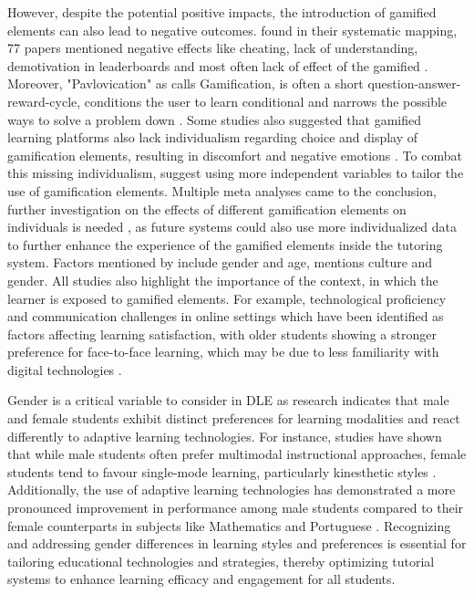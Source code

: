 However, despite the potential positive impacts, the introduction of gamified elements can also lead to negative outcomes.
\textcite{almeidaSystematicMappingNegative2021} found in their systematic mapping, 77 papers mentioned negative effects like cheating, lack of understanding, demotivation in leaderboards and most often lack of effect of the gamified .
Moreover, "Pavlovication" as \textcite{klabbersArchitectureGameScience2018} calls Gamification, is often a short question-answer-reward-cycle, conditions the user to learn conditional and narrows the possible ways to solve a problem down \parencite{klabbersArchitectureGameScience2018}.
Some studies also suggested that gamified learning platforms also lack individualism regarding choice and display of gamification elements, resulting in discomfort and negative emotions \parencite{santosDoesGenderStereotype2023}.
To combat this missing individualism, \textcite{oliveiraTailoredGamificationEducation2023,dehghanzadehUsingGamificationSupport2024} suggest using more independent variables to tailor the use of gamification elements.
Multiple meta analyses came to the conclusion, further investigation on the effects of different gamification elements on individuals is needed \textcite{oliveiraTailoredGamificationEducation2023,dehghanzadehUsingGamificationSupport2024,hamariDoesGamificationWork2014}, as future systems could also use more individualized data to further enhance the experience of the gamified elements inside the tutoring system.
Factors mentioned by \textcite{dehghanzadehUsingGamificationSupport2024} include gender and age, \textcite{oliveiraTailoredGamificationEducation2023} mentions culture and gender. All studies also highlight the importance of the context, in which the learner is exposed to gamified elements.
For example, technological proficiency and communication challenges in online settings which have been identified as factors affecting learning satisfaction, with older students showing a stronger preference for face-to-face learning, which may be due to less familiarity with digital technologies \parencite{dabajRoleGenderAge2009}.


Gender is a critical variable to consider in DLE as research indicates that male and female students exhibit distinct preferences for learning modalities and react differently to adaptive learning technologies.
For instance, studies have shown that while male students often prefer multimodal instructional approaches, female students tend to favour single-mode learning, particularly kinesthetic styles \parencite{wehrweinGenderDifferencesLearning2007}.
Additionally, the use of adaptive learning technologies has demonstrated a more pronounced improvement in performance among male students compared to their female counterparts in subjects like Mathematics and Portuguese \parencite{desantanaEvaluatingImpactMars2016}.
Recognizing and addressing gender differences in learning styles and preferences is essential for tailoring educational technologies and strategies, thereby optimizing tutorial systems to enhance learning efficacy and engagement for all students.

